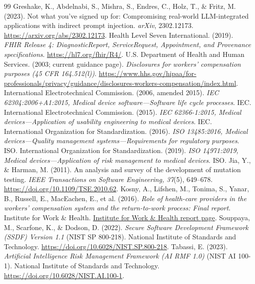 \documentclass[11pt,twocolumn]{article}
\begin{document}
\begin{thebibliography}{99}
 Greshake, K., Abdelnabi, S., Mishra, S., Endres, C., Holz, T., \& Fritz, M. (2023). Not what you've signed up for: Compromising real-world LLM-integrated applications with indirect prompt injection. \emph{arXiv}, 2302.12173. \url{https://arxiv.org/abs/2302.12173}.
 Health Level Seven International. (2019). \emph{FHIR Release 4: DiagnosticReport, ServiceRequest, Appointment, and Provenance specifications}. \url{https://hl7.org/fhir/R4/}.
 U.S. Department of Health and Human Services. (2003; current guidance page). \emph{Disclosures for workers' compensation purposes (45 CFR 164.512(l))}. \url{https://www.hhs.gov/hipaa/for-professionals/privacy/guidance/disclosures-workers-compensation/index.html}.
 International Electrotechnical Commission. (2006, amended 2015). \emph{IEC 62304:2006+A1:2015, Medical device software---Software life cycle processes}. IEC.
 International Electrotechnical Commission. (2015). \emph{IEC 62366-1:2015, Medical devices---Application of usability engineering to medical devices}. IEC.
 International Organization for Standardization. (2016). \emph{ISO 13485:2016, Medical devices---Quality management systems---Requirements for regulatory purposes}. ISO.
 International Organization for Standardization. (2019). \emph{ISO 14971:2019, Medical devices---Application of risk management to medical devices}. ISO.
 Jia, Y., \& Harman, M. (2011). An analysis and survey of the development of mutation testing. \emph{IEEE Transactions on Software Engineering, 37}(5), 649--678. \url{https://doi.org/10.1109/TSE.2010.62}.
 Kosny, A., Lifshen, M., Tonima, S., Yanar, B., Russell, E., MacEachen, E., et al. (2016). \emph{Role of health-care providers in the workers' compensation system and the return-to-work process: Final report}. Institute for Work \& Health. \href{https://www.iwh.on.ca/scientific-reports/role-of-health-care-providers-in-workers-compensation-system-and-return-to-work-process-final-report}{Institute for Work \& Health report page}.
 Souppaya, M., Scarfone, K., \& Dodson, D. (2022). \emph{Secure Software Development Framework (SSDF) Version 1.1} (NIST SP 800-218). National Institute of Standards and Technology. \url{https://doi.org/10.6028/NIST.SP.800-218}.
 Tabassi, E. (2023). \emph{Artificial Intelligence Risk Management Framework (AI RMF 1.0)} (NIST AI 100-1). National Institute of Standards and Technology. \url{https://doi.org/10.6028/NIST.AI.100-1}.

\end{thebibliography}
\end{document}
